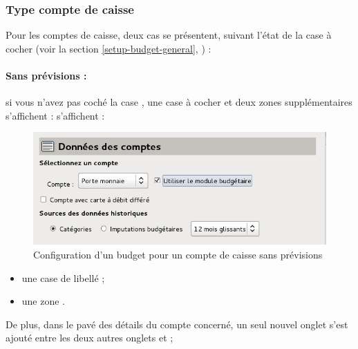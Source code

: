 \subsubsection{Type compte de caisse\label{setup-budget-data-cash}}

Pour les comptes de caisse, deux cas se présentent, suivant l'état de la case à cocher    (voir la section \vref{setup-budget-general}, ) :

\paragraph{Sans prévisions :}si vous n'avez pas coché la case , une case à cocher et deux zones supplémentaires \ifIllustration s'affichent :
\else s'affichent : 
\fi

\ifIllustration
\begin{figure}[ht]
\begin{center}
\includegraphics[scale=0.5]{image/screenshot/setup_budget_dataCash}
\end{center}
\caption{Configuration d'un budget pour un compte de caisse sans prévisions}
\label{setup_budget_dataCash-img}
\end{figure}
\fi

\begin{itemize}
	\item une case de libellé  ; 
	\item une zone .
\end{itemize}

De plus, dans le pavé des détails du compte concerné, un seul nouvel onglet  s'est ajouté entre les deux autres onglets  et  ; 

